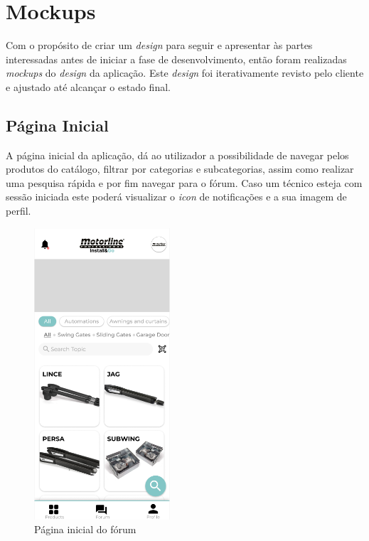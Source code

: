 \section{Mockups}
Com o propósito de criar um \textit{design} para seguir e apresentar às partes interessadas antes de iniciar a fase de desenvolvimento, então foram realizadas \textit{mockups} do \textit{design} da aplicação. Este \textit{design} foi iterativamente revisto pelo cliente e ajustado até alcançar o estado final.

\subsection{Página Inicial}

A página inicial da aplicação, dá ao utilizador a possibilidade de navegar pelos produtos do catálogo, filtrar por categorias e subcategorias, assim como realizar uma pesquisa rápida e por fim navegar para o fórum. Caso um técnico esteja com sessão iniciada este poderá visualizar o \textit{icon} de notificações e a sua imagem de perfil.

\begin{figure}[htb]
  \centering
  \includegraphics[width=0.45\textwidth]{images/mockups/home_screen.png}
  \caption{Página inicial do fórum}
  \label{fig:23}
\end{figure}

